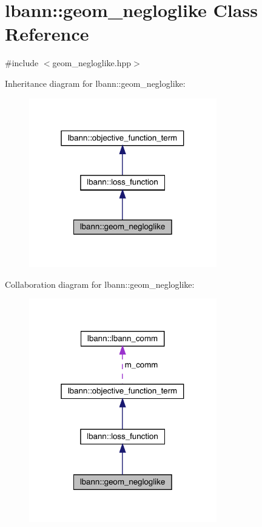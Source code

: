 \hypertarget{classlbann_1_1geom__negloglike}{}\section{lbann\+:\+:geom\+\_\+negloglike Class Reference}
\label{classlbann_1_1geom__negloglike}


{\ttfamily \#include $<$geom\+\_\+negloglike.\+hpp$>$}



Inheritance diagram for lbann\+:\+:geom\+\_\+negloglike\+:\nopagebreak
\begin{figure}[H]
\begin{center}
\leavevmode
\includegraphics[width=232pt]{classlbann_1_1geom__negloglike__inherit__graph}
\end{center}
\end{figure}


Collaboration diagram for lbann\+:\+:geom\+\_\+negloglike\+:\nopagebreak
\begin{figure}[H]
\begin{center}
\leavevmode
\includegraphics[width=232pt]{classlbann_1_1geom__negloglike__coll__graph}
\end{center}
\end{figure}
